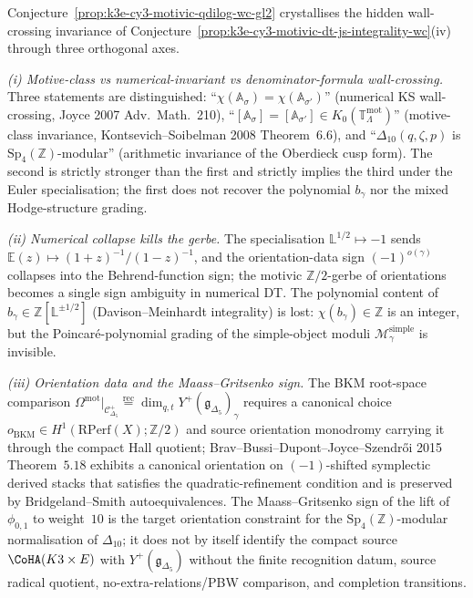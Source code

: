 \begin{remark}
\label{rem:k3e-cy3-motivic-wc-crystallisations}
Conjecture~\ref{prop:k3e-cy3-motivic-qdilog-wc-gl2} crystallises the hidden wall-crossing invariance of Conjecture~\ref{prop:k3e-cy3-motivic-dt-js-integrality-wc}(iv) through three orthogonal axes.

\emph{(i) Motive-class vs numerical-invariant vs denominator-formula wall-crossing.} Three statements are distinguished: ``$\chi(\mathbb A_\sigma) = \chi(\mathbb A_{\sigma'})$'' (numerical KS wall-crossing, Joyce 2007 Adv.\ Math.\ 210), ``$[\mathbb A_\sigma] = [\mathbb A_{\sigma'}] \in K_0(\mathbb T_\Lambda^{\mathrm{mot}})$'' (motive-class invariance, Kontsevich--Soibelman 2008 Theorem~6.6), and ``$\Delta_{10}(q,\zeta,p)$ is $\mathrm{Sp}_4(\mathbb Z)$-modular'' (arithmetic invariance of the Oberdieck cusp form). The second is strictly stronger than the first and strictly implies the third under the Euler specialisation; the first does not recover the polynomial $b_\gamma$ nor the mixed Hodge-structure grading.

\emph{(ii) Numerical collapse kills the gerbe.} The specialisation $\mathbb L^{1/2} \mapsto -1$ sends $\mathbb E(z) \mapsto (1+z)^{-1}/(1-z)^{-1}$, and the orientation-data sign $(-1)^{o(\gamma)}$ collapses into the Behrend-function sign; the motivic $\mathbb Z/2$-gerbe of orientations becomes a single sign ambiguity in numerical DT. The polynomial content of $b_\gamma \in \mathbb Z[\mathbb L^{\pm 1/2}]$ (Davison--Meinhardt integrality) is lost: $\chi(b_\gamma) \in \mathbb Z$ is an integer, but the Poincar\'e-polynomial grading of the simple-object moduli $\mathcal M_\gamma^{\mathrm{simple}}$ is invisible.

\emph{(iii) Orientation data and the Maass--Gritsenko sign.} The BKM root-space comparison $\Omega^{\mathrm{mot}}|_{\mathcal C^+_{\Delta_5}} \stackrel{\mathrm{rec}}{=} \dim_{q,t} Y^+(\mathfrak g_{\Delta_5})_\gamma$ requires a canonical choice $o_{\mathrm{BKM}} \in H^1(\mathrm{RPerf}(X); \mathbb Z/2)$ and source orientation monodromy carrying it through the compact Hall quotient; Brav--Bussi--Dupont--Joyce--Szendr\H oi 2015 Theorem~$5.18$ exhibits a canonical orientation on $(-1)$-shifted symplectic derived stacks that satisfies the quadratic-refinement condition and is preserved by Bridgeland--Smith autoequivalences. The Maass--Gritsenko sign of the lift of $\phi_{0,1}$ to weight~$10$ is the target orientation constraint for the $\mathrm{Sp}_4(\mathbb Z)$-modular normalisation of $\Delta_{10}$; it does not by itself identify the compact source $\CoHA(K3\times E)$ with $Y^+(\mathfrak g_{\Delta_5})$ without the finite recognition datum, source radical quotient, no-extra-relations/PBW comparison, and completion transitions.


\end{remark}
